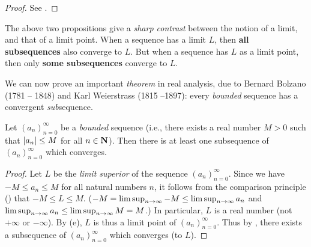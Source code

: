 \begin{proof}
See .
\end{proof}

\begin{remark} \label{remark 6.6.7}
The above two propositions give a \emph{sharp contrast} between the notion of a limit, and that of a limit point.
When a sequence has a limit \(L\), then \textbf{all subsequences} also converge to \(L\).
But when a sequence has \(L\) as a limit point, then only \textbf{some subsequences} converge to \(L\).
\end{remark}

We can now prove an important \emph{theorem} in real analysis, due to Bernard Bolzano (1781 -- 1848) and Karl Weierstrass (1815 --1897):
every \emph{bounded} sequence has a convergent \emph{sub}sequence.

\begin{theorem}  \label{thm 6.6.8}
Let \((a_n)_{n = 0}^{\infty}\) be a \emph{bounded} sequence
(i.e., there exists a real number \(M > 0\) such that \(\lvert a_n\rvert \le M\) for all \(n \in \mathbf{N}\)).
Then there is at least one subsequence of \((a_n)_{n = 0}^{\infty}\) which converges.
\end{theorem}

\begin{proof}
Let \(L\) be the \emph{limit superior} of the sequence \((a_n)_{n = 0}^{\infty}\).
Since we have \(-M \le a_n \le M\) for all natural numbers \(n\), it follows from the comparison principle () that \(-M \le L \le M\).
(\(-M = \limsup_{n \to \infty} -M \le \limsup_{n \to \infty} a_n\) and \( \limsup_{n \to \infty} a_n \le \limsup_{n \to \infty} M = M\).)
In particular, \(L\) is a real number (not \(+\infty\) or \(-\infty\)).
By (e), \(L\) is thus a limit point of \((a_n)_{n = 0}^{\infty}\).
Thus by , there exists a subsequence of \((a_n)_{n = 0}^{\infty}\) which converges (to \(L\)).
\end{proof}


